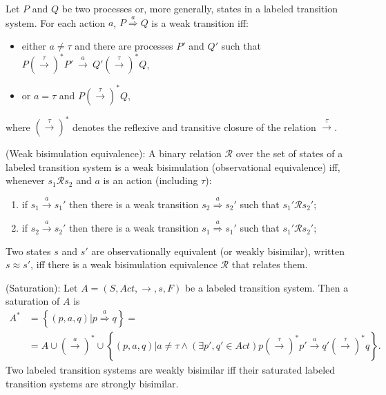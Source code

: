 \begin{definition}
Let $P$ and $Q$ be two processes or, more generally, states in a labeled transition system. For each action $a$,
$P\stackrel{a}{\Rightarrow}Q$ is a weak transition iff:
\begin{itemize}
	\item either $a\neq\tau$ and there are processes $P'$ and $Q'$ such that $P\left(\stackrel{\tau}{\rightarrow}\right)^{*}P'\ \stackrel{a}{\rightarrow}\ Q'\left(\stackrel{\tau}{\rightarrow}\right)^{*}Q$,
	\item or $a=\tau$ and $P\left(\stackrel{\tau}{\rightarrow}\right)^{*}Q$,
\end{itemize}
where $\left(\stackrel{\tau}{\rightarrow}\right)^{*}$ denotes the reflexive and transitive closure of the relation $\stackrel{\tau}{\rightarrow}$.
\end{definition}

\begin{definition}
(Weak bisimulation equivalence): A binary relation $\mathcal{R}$ over the set of states of a labeled transition system is a weak bisimulation (observational equivalence) iff, whenever $s_{1}\mathcal{R} s_{2}$ and $a$ is an action (including $\tau$):
\begin{enumerate}
	\item if $s_{1}\stackrel{a}{\rightarrow}s_{1}'$ then there is a weak transition $s_{2}\stackrel{a}{\Rightarrow}s_{2}'$ such that $s_{1}'\mathcal{R} s_{2}'$;
	\item if $s_{2}\stackrel{a}{\rightarrow}s_{2}'$ then there is a weak transition $s_{1}\stackrel{a}{\Rightarrow}s_{1}'$ such that $s_{1}'\mathcal{R} s_{2}'$;
\end{enumerate}
Two states $s$ and $s'$ are observationally equivalent (or weakly bisimilar), written $s\approx s'$, iff there is a weak bisimulation equivalence $\mathcal{R}$ that relates them.
\end{definition}

\begin{definition}
(Saturation): Let $A=\left(S, Act, \rightarrow, s, F \right)$ be a labeled transition system. Then a saturation of $A$ is
\begin{align*}
 A^{*} &=\left\{\left(p,a,q\right)| p\stackrel{a}{\Rightarrow}q\right\}= \\
 &=A\cup\left(\stackrel{a}{\rightarrow}\right)^{*}\cup\left\{\left(p,a,q\right)| a\neq\tau\wedge\left(\exists p',q'\in Act\right) p\left(\stackrel{\tau}{\rightarrow}\right)^{*}p'\stackrel{a}{\rightarrow}q'\left(\stackrel{\tau}{\rightarrow}\right)^{*}q\right\}.
\end{align*}
Two labeled transition systems are weakly bisimilar iff their saturated labeled transition systems are strongly bisimilar. 
\end{definition}

